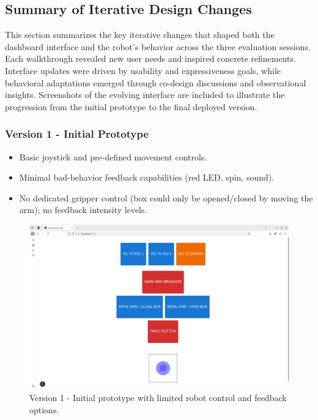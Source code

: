 \documentclass[a4paper]{usiinfbachelorproject}
\begin{document}
\subsection{\textbf{Summary of Iterative Design Changes}}
This section summarizes the key iterative changes that shaped both the dashboard interface and the robot's behavior across the three evaluation sessions.
Each walkthrough revealed new user needs and inspired concrete refinements.
Interface updates were driven by usability and expressiveness goals, while behavioral adaptations emerged through co-design discussions and observational insights.
Screenshots of the evolving interface are included to illustrate the progression from the initial prototype to the final deployed version.

\subsubsection*{\textbf{Version 1 - Initial Prototype}}
\begin{itemize}
    \item Basic joystick and pre-defined movement controls.
    \item Minimal bad-behavior feedback capabilities (red LED, spin, sound).
    \item No dedicated gripper control (box could only be opened/closed by moving the arm); no feedback intensity levels.
\end{itemize}
\begin{figure}[H]
    \centering
    \includegraphics[width=0.8\linewidth]{figures/dashboard_v1.png}
    \caption{Version 1 - Initial prototype with limited robot control and feedback options.}
    \label{fig:dashboard-v1}
\end{figure}
\end{document}
